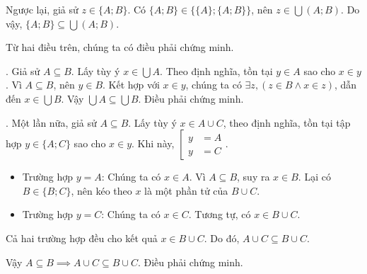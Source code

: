 Ngược lại, giả sử $z \in \{A; B\}$. Có $\{A; B\} \in \big\{\{A\}; \{A; B\}\big\}$, nên $z \in \bigcup (A; B)$. Do vậy, $\{A; B\} \subseteq \bigcup (A; B)$.

Từ hai điều trên, chúng ta có điều phải chứng minh.

. Giả sử $A \subseteq B$. Lấy tùy ý $x \in \bigcup A$. Theo định nghĩa, tồn tại $y \in A$ sao cho $x \in y$. Vì $A \subseteq B$, nên $y \in B$. Kết hợp với $x \in y$, chúng ta có $\exists z, (z \in B \land x \in z)$, dẫn đến $x \in \bigcup B$. Vậy $\bigcup A \subseteq \bigcup B$. Điều phải chứng minh.

. Một lần nữa, giả sử $A \subseteq B$. Lấy tùy ý $x \in A \cup C$, theo định nghĩa, tồn tại tập hợp $y \in \{A; C\}$ sao cho $x \in y$. Khi này, $\left[\begin{aligned}
      y &= A \\
      y &= C
   \end{aligned}\right.$.
\begin{itemize}
   \item \textcolor{colorEmphasis}{Trường hợp $y = A$}: Chúng ta có $x \in A$. Vì $A \subseteq B$, suy ra $x \in B$. Lại có $B \in \{B; C\}$, nên kéo theo $x$ là một phần tử của $B \cup C$.
   \item \textcolor{colorEmphasisCyan}{Trường hợp $y = C$}: Chúng ta có $x \in C$. Tương tự, có $x \in B \cup C$.
\end{itemize}
Cả hai trường hợp đều cho kết quả $x \in B \cup C$. Do đó, $A \cup C \subseteq B \cup C$.

Vậy $A \subseteq B \implies A \cup C \subseteq B \cup C$. Điều phải chứng minh.

